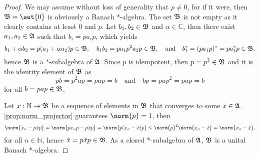 \begin{proof}
    We may assume without loss of generality that \(p \neq 0\), for if it were, then \(\algebra{B} = \set{0}\) is obviously a Banach *-algebra. The set \(\mathfrak{B}\) is not empty as it clearly contains at least \(0\) and \(p\). Let \(b_1,b_2 \in \mathfrak{B}\) and \(\alpha \in \mathbb{C}\), then there exist \(a_1,a_2 \in \mathfrak{A}\) such that \(b_i = pa_ip\), which yields
    \begin{equation*}
        b_1 + \alpha b_2 = p(a_1 + \alpha a_2)p \in \mathfrak{B},
        \quad
        b_1 b_2 = pa_1 p^2 a_2 p \in \mathfrak{B},
        \quad\text{and}\quad
        b_1^* = (pa_1p)^* = pa_1^*p \in \mathfrak{B},
    \end{equation*}
    hence \(\mathfrak{B}\) is a *-subalgebra of \(\mathfrak{A}\). Since \(p\) is idempotent, then \(p = p^3 \in \mathfrak{B}\) and it is the identity element of \(\mathfrak{B}\) as
    \begin{equation*}
        pb = p^2ap = pap = b
        \quad\text{and}\quad
        bp = pap^2 = pap = b
    \end{equation*}
    for all \(b = pap \in \mathfrak{B}\).

    Let \(x : \mathbb{N} \to \mathfrak{B}\) be a sequence of elements in \(\mathfrak{B}\) that converges to some \(\tilde{x} \in \mathfrak{A}\). \cref{prop:norm_projector} guarantees \(\norm{p} = 1\), then
    \begin{equation*}
        \norm{x_n - p\tilde{x}p} = \norm{px_np - p\tilde{x}p} =
        \norm{p(x_n - \tilde{x})p} \leq \norm{p}^2 \norm{x_n - \tilde{x}} = \norm{x_n - \tilde{x}},
    \end{equation*}
    for all \(n \in \mathbb{N}\), hence \(\tilde{x} = p \tilde{x} p \in \mathfrak{B}\). As a closed *-subalgebra of \(\mathfrak{A}\), \(\mathfrak{B}\) is a unital Banach *-algebra.
\end{proof}

